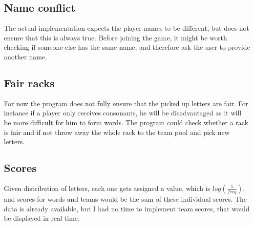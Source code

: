 \documentclass[a4paper,12pt]{article}
\begin{document}
\subsection{Name conflict}
The actual implementation expects the player names to be different, but does not ensure that this is always true. Before joining the game, it might be worth checking if someone else has the same name, and therefore ask the user to provide another name.

\subsection{Fair racks}
For now the program does not fully ensure that the picked up letters are fair. For instance if a player only receives consonants, he will be disadvantaged as it will be more difficult for him to form words. The program could check whether a rack is fair and if not throw away the whole rack to the team pool and pick new letters.

\subsection{Scores}
Given distribution of letters, each one gets assigned a value, which is $log(\frac{1}{freq})$, and scores for words and teams would be the sum of these individual scores. The data is already available, but I had no time to implement team scores, that would be displayed in real time.
\end{document}
